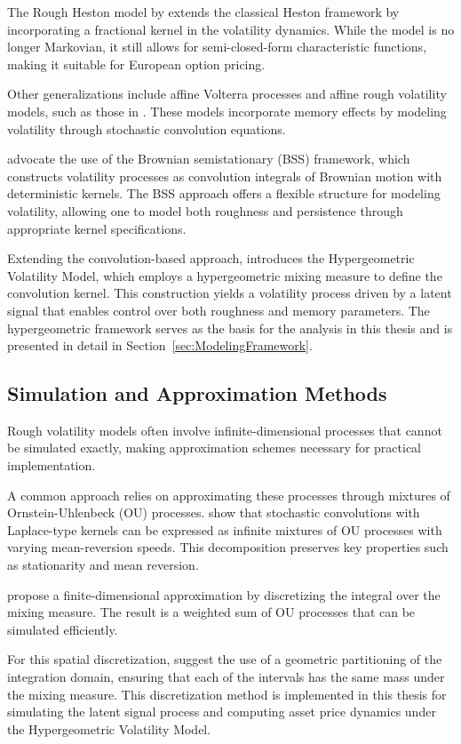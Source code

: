 The Rough Heston model by \citet{ElEuchRosenbaum2019} extends the classical Heston framework by incorporating a fractional kernel in the volatility dynamics. While the model is no longer Markovian, it still allows for semi-closed-form characteristic functions, making it suitable for European option pricing.

Other generalizations include affine Volterra processes and affine rough volatility models, such as those in \citet{AbiJaberLarssonPulido2019}. These models incorporate memory effects by modeling volatility through stochastic convolution equations.

\citet{BennedsenLundePakkanen2021} advocate the use of the Brownian semistationary (BSS) framework, which constructs volatility processes as convolution integrals of Brownian motion with deterministic kernels. The BSS approach offers a flexible structure for modeling volatility, allowing one to model both roughness and persistence through appropriate kernel specifications.

Extending the convolution-based approach, \citet{Damian2021} introduces the Hypergeometric Volatility Model, which employs a hypergeometric mixing measure to define the convolution kernel. This construction yields a volatility process driven by a latent signal that enables control over both roughness and memory parameters. The hypergeometric framework serves as the basis for the analysis in this thesis and is presented in detail in Section~\ref{sec:ModelingFramework}.


\subsection{Simulation and Approximation Methods} \label{subsec:SimulationApproximation}

Rough volatility models often involve infinite-dimensional processes that cannot be simulated exactly, making approximation schemes necessary for practical implementation.

A common approach relies on approximating these processes through mixtures of Ornstein-Uhlenbeck (OU) processes. \citet{CarmonaCoutin1998} show that stochastic convolutions with Laplace-type kernels can be expressed as infinite mixtures of OU processes with varying mean-reversion speeds. This decomposition preserves key properties such as stationarity and mean reversion.

\citet{CarmonaCoutinMontseny2000} propose a finite-dimensional approximation by discretizing the integral over the mixing measure. The result is a weighted sum of OU processes that can be simulated efficiently.

For this spatial discretization, \citet{DamianFrey2024} suggest the use of a geometric partitioning of the integration domain, ensuring that each of the intervals has the same mass under the mixing measure. This discretization method is implemented in this thesis for simulating the latent signal process and computing asset price dynamics under the Hypergeometric Volatility Model.